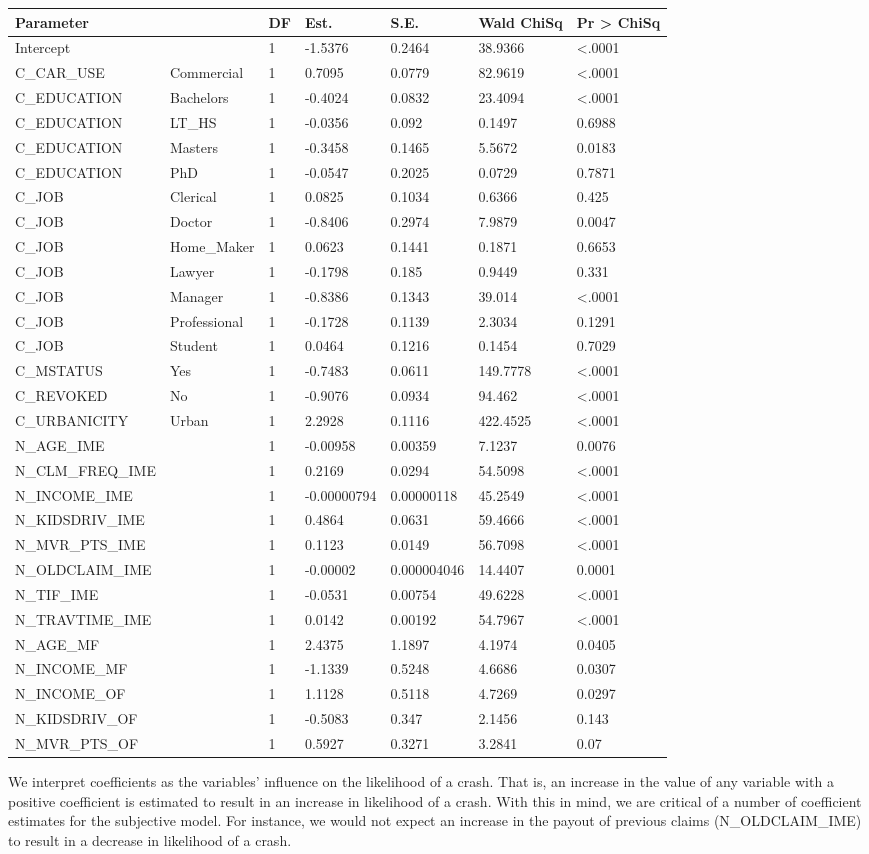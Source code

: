 \documentclass[]{article}
\begin{document}
\begin{longtable}[]{@{}lllllll@{}}
\toprule
Parameter & & DF & Est. & S.E. & Wald ChiSq & Pr \textgreater{}
ChiSq\tabularnewline
\midrule
\endhead
Intercept & & 1 & -1.5376 & 0.2464 & 38.9366 &
\textless{}.0001\tabularnewline
C\_CAR\_USE & Commercial & 1 & 0.7095 & 0.0779 & 82.9619 &
\textless{}.0001\tabularnewline
C\_EDUCATION & Bachelors & 1 & -0.4024 & 0.0832 & 23.4094 &
\textless{}.0001\tabularnewline
C\_EDUCATION & LT\_HS & 1 & -0.0356 & 0.092 & 0.1497 &
0.6988\tabularnewline
C\_EDUCATION & Masters & 1 & -0.3458 & 0.1465 & 5.5672 &
0.0183\tabularnewline
C\_EDUCATION & PhD & 1 & -0.0547 & 0.2025 & 0.0729 &
0.7871\tabularnewline
C\_JOB & Clerical & 1 & 0.0825 & 0.1034 & 0.6366 & 0.425\tabularnewline
C\_JOB & Doctor & 1 & -0.8406 & 0.2974 & 7.9879 & 0.0047\tabularnewline
C\_JOB & Home\_Maker & 1 & 0.0623 & 0.1441 & 0.1871 &
0.6653\tabularnewline
C\_JOB & Lawyer & 1 & -0.1798 & 0.185 & 0.9449 & 0.331\tabularnewline
C\_JOB & Manager & 1 & -0.8386 & 0.1343 & 39.014 &
\textless{}.0001\tabularnewline
C\_JOB & Professional & 1 & -0.1728 & 0.1139 & 2.3034 &
0.1291\tabularnewline
C\_JOB & Student & 1 & 0.0464 & 0.1216 & 0.1454 & 0.7029\tabularnewline
C\_MSTATUS & Yes & 1 & -0.7483 & 0.0611 & 149.7778 &
\textless{}.0001\tabularnewline
C\_REVOKED & No & 1 & -0.9076 & 0.0934 & 94.462 &
\textless{}.0001\tabularnewline
C\_URBANICITY & Urban & 1 & 2.2928 & 0.1116 & 422.4525 &
\textless{}.0001\tabularnewline
N\_AGE\_IME & & 1 & -0.00958 & 0.00359 & 7.1237 & 0.0076\tabularnewline
N\_CLM\_FREQ\_IME & & 1 & 0.2169 & 0.0294 & 54.5098 &
\textless{}.0001\tabularnewline
N\_INCOME\_IME & & 1 & -0.00000794 & 0.00000118 & 45.2549 &
\textless{}.0001\tabularnewline
N\_KIDSDRIV\_IME & & 1 & 0.4864 & 0.0631 & 59.4666 &
\textless{}.0001\tabularnewline
N\_MVR\_PTS\_IME & & 1 & 0.1123 & 0.0149 & 56.7098 &
\textless{}.0001\tabularnewline
N\_OLDCLAIM\_IME & & 1 & -0.00002 & 0.000004046 & 14.4407 &
0.0001\tabularnewline
N\_TIF\_IME & & 1 & -0.0531 & 0.00754 & 49.6228 &
\textless{}.0001\tabularnewline
N\_TRAVTIME\_IME & & 1 & 0.0142 & 0.00192 & 54.7967 &
\textless{}.0001\tabularnewline
N\_AGE\_MF & & 1 & 2.4375 & 1.1897 & 4.1974 & 0.0405\tabularnewline
N\_INCOME\_MF & & 1 & -1.1339 & 0.5248 & 4.6686 & 0.0307\tabularnewline
N\_INCOME\_OF & & 1 & 1.1128 & 0.5118 & 4.7269 & 0.0297\tabularnewline
N\_KIDSDRIV\_OF & & 1 & -0.5083 & 0.347 & 2.1456 & 0.143\tabularnewline
N\_MVR\_PTS\_OF & & 1 & 0.5927 & 0.3271 & 3.2841 & 0.07\tabularnewline
\bottomrule
\end{longtable}

We interpret coefficients as the variables' influence on the likelihood
of a crash. That is, an increase in the value of any variable with a
positive coefficient is estimated to result in an increase in likelihood
of a crash. With this in mind, we are critical of a number of
coefficient estimates for the subjective model. For instance, we would
not expect an increase in the payout of previous claims
(N\_OLDCLAIM\_IME) to result in a decrease in likelihood of a crash.
\end{document}
